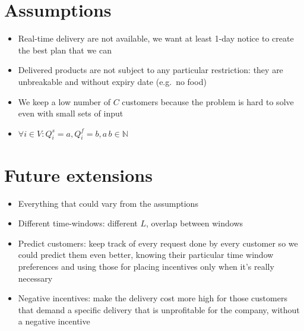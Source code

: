 \documentclass[10pt, letterpaper]{article}
\begin{document}
\section{Assumptions}
\begin{itemize}
	\item 
		Real-time delivery are not available, we want at least 1-day notice
		to create the best plan that we can

	\item 
		Delivered products are not subject to any particular restriction:
		they are unbreakable and without expiry date (e.g.\ no food)


	\item 
		We keep a low number of \(C\) customers because the problem is hard
		to solve even with small sets of input

	\item
		\( \forall i\in V:Q_{i}^{s}=a,Q_{i}^{f}=b,a\,b\in\mathbb{{N}} \)
\end{itemize}

\section{Future extensions}
\begin{itemize}
	\item
		Everything that could vary from the assumptions

	\item
		Different time-windows: different \(L\), overlap between windows

	\item 
		Predict customers: keep track of every request done by every customer 
		so we could predict them even better, knowing their particular 
		time window preferences and using those for placing incentives only 
		when it's really necessary

	\item 
		Negative incentives: make the delivery cost more high for those 
		customers that demand a specific delivery that is unprofitable for 
		the company, without a negative incentive
\end{itemize}
\end{document}
